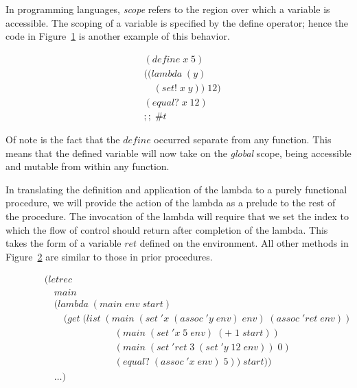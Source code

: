 In programming languages, \emph{scope} refers to the region over which a variable is
accessible. The scoping of a variable is specified by the define operator; hence the 
code in Figure~\ref{fig:setScopeExample} is another example of this behavior.

\begin{figure}[htp]
\caption{}\label{fig:setScopeExample}
\begin{align*}
& (define \; x \; 5)
\\& ((lambda \; (y)
\\& \quad (set! \; x \; y)) \; 12)
\\& (equal? \; x \; 12) \; 
\\& ;; \; \#t
\end{align*}
\end{figure}

Of note is the fact that the $define$ occurred separate from any function. This 
means that the defined variable will now take on the \emph{global} scope, being accessible 
and mutable from within any function. 

In translating the definition and application of the lambda to a purely
functional procedure, we will provide the action of the lambda as a prelude to
the rest of the procedure. The invocation of the lambda will require that we
set the index to which the flow of control should return after completion of
the lambda. This takes the form of a variable $ret$ defined on the environment.
All other methods in Figure~\ref{fig:imperFunc} are similar to those in prior
procedures.

\begin{figure}[htp]
\caption{}\label{fig:imperFunc}
\begin{align*}
& (letrec \; 
\\& \quad main \; 
\\& \quad (lambda \; (main \; env \; start)
\\& \qquad (get \; (list \; (main \; (set \; 'x \; (assoc \; 'y \; env) \; env) \; (assoc \; 'ret \; env))
\\& \qquad \qquad \qquad \quad \; (main \; (set \; 'x \; 5 \; env) \; (+ \; 1 \; start))
\\& \qquad \qquad \qquad \quad \; (main \; (set \; 'ret \; 3 \; (set \; 'y \; 12 \; env)) \; 0)
\\& \qquad \qquad \qquad \quad \; (equal? \; (assoc \; 'x \; env) \; 5)) \; start))
\\& \quad \dots)
\end{align*}
\end{figure}

